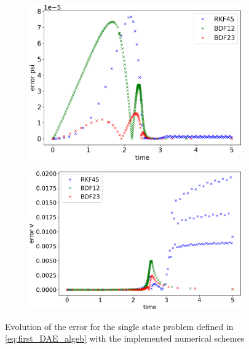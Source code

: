 \begin{figure}[H]
    \centering
    \begin{subfigure}{0.43\textwidth}
    	\centering
    	\includegraphics[width=1\textwidth]{images/timeEvolutionPSIerror.png}
        \label{fig:timeEvolutionErrorPSI}
    \end{subfigure}
    \begin{subfigure}{0.43\textwidth}
    	\centering
    	\includegraphics[width=1\textwidth]{images/timeEvolutionVerror.png}
        \label{fig:timeEvolutionVerror}
    \end{subfigure}
    \caption{Evolution of the error for the single state problem defined in \autoref{eq:first_DAE_algeb} with the implemented numerical schemes}
\end{figure}


